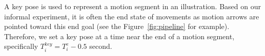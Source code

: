 %



A key pose is used to represent a motion segment in an illustration. Based on our informal experiment, it is often the end state of movements as motion arrows are pointed toward this end goal (see the Figure~\ref{fig:pipeline} for example). Therefore, we set a key pose at a time near the end of a motion segment, specifically $T_i^{key} = T_i^e - 0.5$ second.

